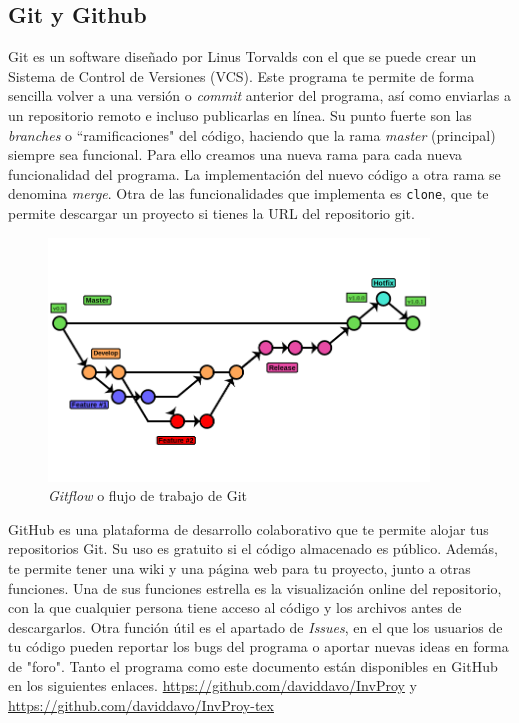 \documentclass[a4paper, 11pt]{report} %
\begin{document}
\subsection{Git y Github}
Git es un software diseñado por Linus Torvalds con el que se puede crear un Sistema de
Control de Versiones (VCS). Este programa te permite
de forma sencilla volver a una versión o \textit{commit} anterior del programa, así
como enviarlas a un \gls{repositorio} remoto e incluso publicarlas en línea. Su punto fuerte
son las \textit{branches} o ``ramificaciones" del código, haciendo que la rama
\textit{master} (principal) siempre sea funcional. Para ello creamos una nueva rama para cada nueva funcionalidad del programa. La implementación del nuevo código a otra rama se denomina \textit{merge}. Otra de las funcionalidades que implementa es \texttt{clone}, que te permite descargar un proyecto si tienes la URL del \gls{repositorio} git.
\begin{figure}[H]
\noindent
\includegraphics[width=0.9\textwidth]{Resources/Gitflow.png}
\caption{\textit{Gitflow} o flujo de trabajo de Git}
\end{figure}

GitHub es una plataforma de desarrollo colaborativo que te permite alojar tus repositorios Git. Su uso es gratuito si el código almacenado es público. Además, te permite tener una wiki y una página web para tu proyecto, junto a otras funciones.
Una de sus funciones estrella es la visualización online del repositorio, con la que cualquier persona tiene acceso al código y los archivos antes de descargarlos. Otra función útil es el apartado de \textit{Issues}, en el que los usuarios de tu código pueden reportar los bugs del programa o aportar nuevas ideas en forma de "foro".
Tanto el programa como este documento están disponibles en GitHub en los siguientes enlaces. \url{https://github.com/daviddavo/InvProy} y \url{https://github.com/daviddavo/InvProy-tex}
\end{document}
